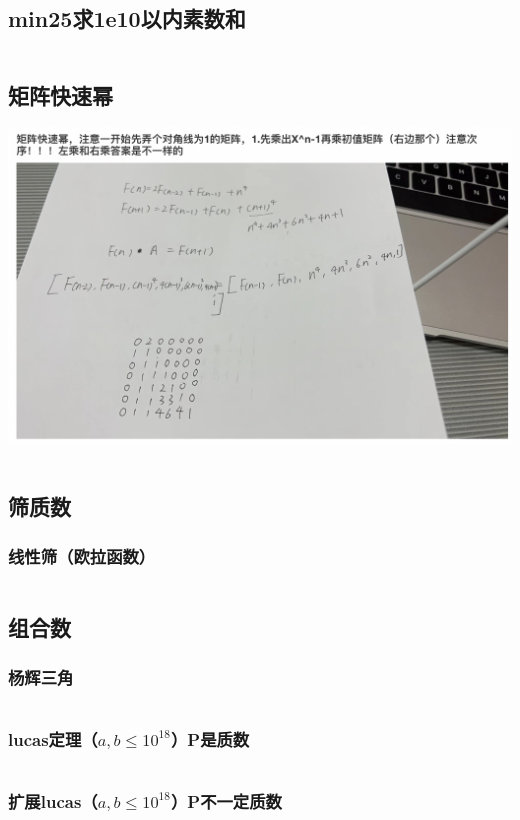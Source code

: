 \documentclass[a4paper,11pt]{article}
\begin{document}
\subsection{min25求1e10以内素数和} %
\inputminted[breaklines]{c++}{数论/min25.cpp}
\subsection{矩阵快速幂} %
\includegraphics[scale=0.6]{数论/矩阵.png}
\inputminted[breaklines]{c++}{数论/矩阵快速幂.cpp}
\subsection{筛质数} %
\subsubsection{线性筛（欧拉函数）} %
\inputminted[breaklines]{c++}{数论/线性筛求欧拉函数.cpp}
\subsection{组合数} %
\subsubsection{杨辉三角} %
\inputminted[breaklines]{c++}{数论/杨辉三角.cpp}
\subsubsection{lucas定理（$a,b\le10^{18}$）P是质数} %
\inputminted[breaklines]{c++}{数论/lucas.cpp}
\subsubsection{扩展lucas（$a,b\le10^{18}$）P不一定质数} %
\inputminted[breaklines]{c++}{数论/扩展lucas.cpp}
\end{document}
